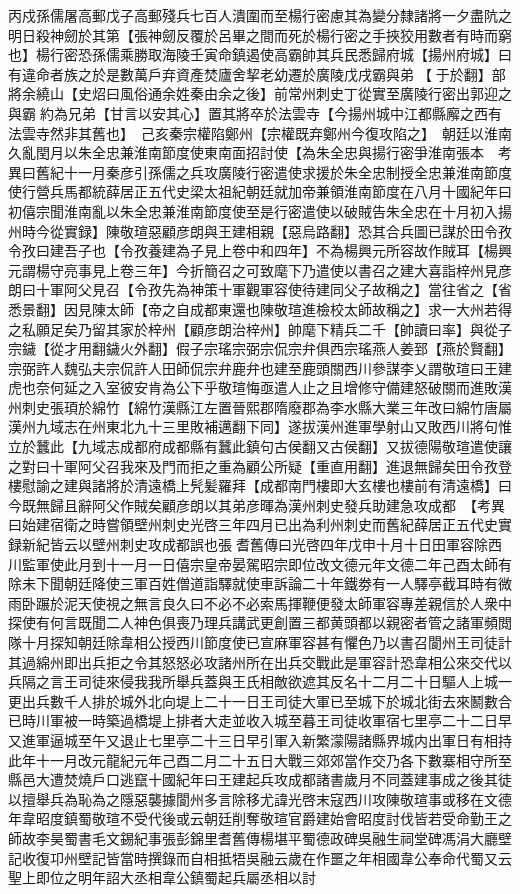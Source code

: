 丙戍孫儒屠高郵戊子高郵殘兵七百人潰圍而至楊行密慮其為變分隸諸將一夕盡阬之明日殺神劒於其第【張神劒反覆於呂畢之間而死於楊行密之手挾狡用數者有時而窮也】楊行密恐孫儒乘勝取海陵壬寅命鎮遏使高霸帥其兵民悉歸府城【揚州府城】曰有違命者族之於是數萬戶弃資產焚廬舍挈老幼遷於廣陵戊戌霸與弟【于於翻】部將余繞山【史炤曰風俗通余姓秦由余之後】前常州刺史丁從實至廣陵行密出郭迎之與霸約為兄弟【甘言以安其心】置其將卒於法雲寺【今揚州城中江都縣廨之西有法雲寺然非其舊也】　己亥秦宗權陷鄭州【宗權既弃鄭州今復攻陷之】　朝廷以淮南久亂閏月以朱全忠兼淮南節度使東南面招討使【為朱全忠與揚行密爭淮南張本　考異曰舊紀十一月秦彦引孫儒之兵攻廣陵行密遣使求援於朱全忠制授全忠兼淮南節度使行營兵馬都統薛居正五代史梁太祖紀朝廷就加帝兼領淮南節度在八月十國紀年曰初僖宗聞淮南亂以朱全忠兼淮南節度使至是行密遣使以破賊告朱全忠在十月初入揚州時今從實録】陳敬瑄惡顧彦朗與王建相親【惡烏路翻】恐其合兵圖已謀於田令孜令孜曰建吾子也【令孜養建為子見上卷中和四年】不為楊興元所容故作賊耳【楊興元謂楊守亮事見上卷三年】今折簡召之可致麾下乃遣使以書召之建大喜詣梓州見彦朗曰十軍阿父見召【令孜先為神策十軍觀軍容使待建同父子故稱之】當往省之【省悉景翻】因見陳太師【帝之自成都東還也陳敬瑄進檢校太師故稱之】求一大州若得之私願足矣乃留其家於梓州【顧彦朗治梓州】帥麾下精兵二千【帥讀曰率】與從子宗鐬【從才用翻鐬火外翻】假子宗瑤宗弼宗侃宗弁俱西宗瑤燕人姜郅【燕於賢翻】宗弼許人魏弘夫宗侃許人田師侃宗弁鹿弁也建至鹿頭關西川參謀李乂謂敬瑄曰王建虎也奈何延之入室彼安肯為公下乎敬瑄悔亟遣人止之且增修守備建怒破關而進敗漢州刺史張頊於綿竹【綿竹漢縣江左置晉熙郡隋廢郡為李水縣大業三年改曰綿竹唐屬漢州九域志在州東北九十三里敗補邁翻下同】遂拔漢州進軍學射山又敗西川將句惟立於蠶此【九域志成都府成都縣有蠶此鎮句古侯翻又古侯翻】又拔德陽敬瑄遣使讓之對曰十軍阿父召我來及門而拒之重為顧公所疑【重直用翻】進退無歸矣田令孜登樓慰諭之建與諸將於清遠橋上髠髪羅拜【成都南門樓即大玄樓也樓前有清遠橋】曰今既無歸且辭阿父作賊矣顧彦朗以其弟彦暉為漢州刺史發兵助建急攻成都　【考異曰始建宿衛之時嘗領壁州刺史光啓三年四月已出為利州刺史而舊紀薛居正五代史實録新紀皆云以壁州刺史攻成都誤也張耆舊傳曰光啓四年戊申十月十日田軍容除西川監軍使此月到十一月一日僖宗皇帝晏駕昭宗即位改文德元年文德二年己酉太師有除未下聞朝廷降使三軍百姓僧道詣驛就使車訴論二十年鐵劵有一人驛亭截耳時有微雨卧蹍於泥天使視之無言良久曰不必不必索馬揮鞭便發太師軍容專差親信於人衆中探使有何言既聞二人神色俱喪乃理兵講武更創置三都黄頭都以親密者管之諸軍頻閲隊十月探知朝廷除韋相公授西川節度使已宣麻軍容甚有懼色乃以書召閬州王司徒計其過綿州即出兵拒之令其怒怒必攻諸州所在出兵交戰此是軍容計恐韋相公來交代以兵隔之言王司徒來侵我我所舉兵蓋與王氏相敵欲遮其反名十二月二十日驅人上城一更出兵數千人排於城外北向堤上二十一日王司徒大軍已至城下於城北街去來鬭數合已時川軍被一時築過橋堤上排者大走並收入城至暮王司徒收軍宿七里亭二十二日早又進軍逼城至午又退止七里亭二十三日早引軍入新繁濛陽諸縣界城内出軍日有相持此年十一月改元龍紀元年己酉二月二十五日大戰三郊郊當作交乃各下數寨相守所至縣邑大遭焚燒戶口逃竄十國紀年曰王建起兵攻成都諸書歲月不同蓋建事成之後其徒以擅舉兵為恥為之隱惡襲據閬州多言除移尤諱光啓末寇西川攻陳敬瑄事或移在文德年韋昭度鎮蜀敬瑄不受代後或云朝廷削奪敬瑄官爵建始會昭度討伐皆若受命勤王之師故李昊蜀書毛文錫紀事張彭錦里耆舊傳楊堪平蜀德政碑吳融生祠堂碑馮涓大廳壁記收復卭州壁記皆當時撰錄而自相抵牾吳融云歲在作噩之年相國韋公奉命代蜀又云聖上即位之明年詔大丞相韋公鎮蜀起兵屬丞相以討